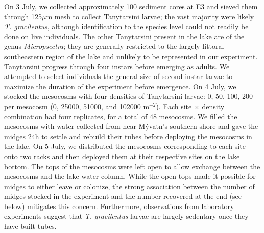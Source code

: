 \documentclass[12pt]{article}
\begin{document}
On 3 July, 
we collected approximately 100 sediment cores at E3 and 
sieved them through 125$\mu \text{m}$ mesh
to collect Tanytarsini larvae; 
the vast majority were likely \textit{T. gracilentus},
although identification to the species level could not readily be done on live individuals.
The other Tanytarsini present in the lake are of the genus \textit{Micropsectra}; 
they are generally restricted to the largely littoral
southeastern region of the lake and unlikely 
to be represented in our experiment.
Tanytarsini progress through four instars before emerging as adults.
We attempted to select individuals the general size of second-instar larvae
to maximize the duration of the experiment before emergence.
On 4 July, we stocked the mesocosms with four densities of Tanytarsini larvae:
0, 50, 100, 200 per mesocosm (0, 25000, 51000, and 102000 $\text{m}^{-2}$). 
Each site $\times$ density combination had four replicates, for a total of 48 mesocosms.
We filled the mesocosms with water collected from near  M\'{y}vatn's southern shore
and gave the midges 24h to settle and rebuild their tubes
before deploying the mesocosms in the lake.
On 5 July, 
we distributed the mesocosms corresponding to each site onto two racks and then
deployed them at their respective sites on the lake bottom.
The tops of the mesocosms were left open to allow exchange between the mesocosms
and the lake water column.
While the open tops made it possible for midges to either leave or colonize,
the strong association between the number of midges stocked in the experiment and 
the number recovered at the end (see below) mitigates this concern.
Furthermore, observations from laboratory experiments \citep[e.g.,][]{wetzel2021}
suggest that \textit{T. gracilentus} larvae are largely sedentary 
once they have built tubes.
\end{document}

